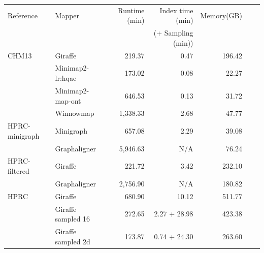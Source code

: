 \documentclass[11pt]{ucscthesis}
\begin{document}
\begin{landscape}
\begin{table}[htb]
    \centering
    \begin{threeparttable}
    \begin{tabular}{|l|l|r|r|r|r|r|}

    \hline
    Reference            & Mapper	                     & Runtime (min)	& Index time (min)	       & Memory(GB)	\\
                         &                               &                  & (+ Sampling (min))       &    \\
    \hline
    CHM13                & Giraffe                       & 219.37           & 0.47                     & 196.42   \\
                         & Minimap2-lr:hqae              & 173.02           & 0.08                     & 22.27   \\
                         & Minimap2-map-ont              & 646.53           & 0.13                     & 31.72   \\
                         & Winnowmap                     & 1,338.33         & 2.68                     & 47.77   \\
    HPRC-minigraph       & Minigraph                     & 657.08           & 2.29                     & 39.08   \\
                         & Graphaligner                 & 5,946.63         & N/A                      & 76.24   \\
    HPRC-filtered        & Giraffe                       & 221.72           & 3.42                     & 232.10   \\
                         & Graphaligner\tnote{*}                 & 2,756.90         & N/A                      & 180.82   \\
    HPRC                 & Giraffe                       & 680.90           & 10.12                    & 511.77   \\
                         & Giraffe sampled 16            & 272.65           & 2.27 + 28.98             & 423.38   \\
                         & Giraffe sampled 2d            & 173.87           & 0.74 + 24.30             & 263.60   \\


\end{tabular}
\end{threeparttable}
\end{table}
\end{landscape}
\end{document}
